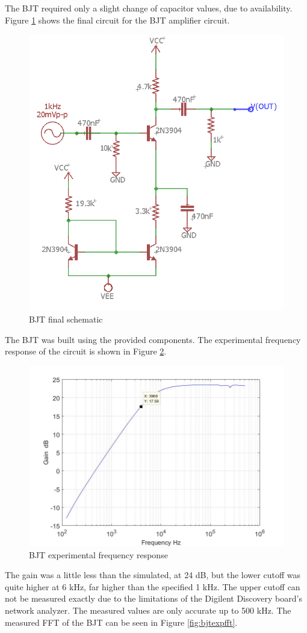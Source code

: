 The BJT required only a slight change of capacitor values, due to availability. Figure \ref{fig:bjtexp} shows the final circuit for the BJT amplifier circuit.

\begin{figure}[H]
	\centering
	\includegraphics[width=0.7\linewidth]{ExperimentalImplementation/BJT_Exp}
	\caption{BJT final schematic}
	\label{fig:bjtexp}
\end{figure}

The BJT was built using the provided components. The experimental frequency response of the circuit is shown in Figure \ref{fig:bjtexpfreq}.



\begin{figure}[H]
	\centering
	\includegraphics[width=0.7\linewidth]{ExperimentalImplementation/bjt_outputexp.jpg}
	\caption{BJT experimental frequency response}
	\label{fig:bjtexpfreq}
\end{figure}
The gain was a little less than the simulated, at 24 dB, but the lower cutoff was quite higher at 6 kHz, far higher than the specified 1 kHz. The upper cutoff can not be measured exactly due to the limitations of the Digilent Discovery board's network analyzer. The measured values are only accurate up to 500 kHz. The measured FFT of the BJT can be seen in Figure \ref{fig:bjtexpfft}.


